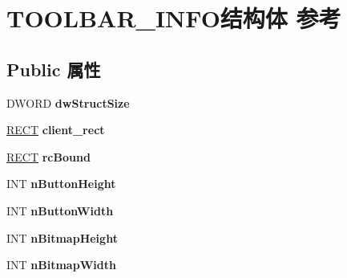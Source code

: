 \hypertarget{struct_t_o_o_l_b_a_r___i_n_f_o}{}\section{T\+O\+O\+L\+B\+A\+R\+\_\+\+I\+N\+F\+O结构体 参考}
\label{struct_t_o_o_l_b_a_r___i_n_f_o}
\subsection*{Public 属性}
\begin{DoxyCompactItemize}
\item 
\mbox{\label{struct_t_o_o_l_b_a_r___i_n_f_o_a9534167bdc4347206c2d0cf99f0d5d85}} 
D\+W\+O\+RD {\bfseries dw\+Struct\+Size}
\item 
\mbox{\label{struct_t_o_o_l_b_a_r___i_n_f_o_a04d05fea67ac153311fb3f33cab8c250}} 
\hyperlink{structtag_r_e_c_t}{R\+E\+CT} {\bfseries client\+\_\+rect}
\item 
\mbox{\label{struct_t_o_o_l_b_a_r___i_n_f_o_a894a31368d7639209eb26addf3ed2211}} 
\hyperlink{structtag_r_e_c_t}{R\+E\+CT} {\bfseries rc\+Bound}
\item 
\mbox{\label{struct_t_o_o_l_b_a_r___i_n_f_o_a806b3ef26a32764e5790c7f5c067f762}} 
I\+NT {\bfseries n\+Button\+Height}
\item 
\mbox{\label{struct_t_o_o_l_b_a_r___i_n_f_o_a463a0ef11636e469240aa1ded40bf2db}} 
I\+NT {\bfseries n\+Button\+Width}
\item 
\mbox{\label{struct_t_o_o_l_b_a_r___i_n_f_o_a4e843a26a5934925a479d827c3b8424a}} 
I\+NT {\bfseries n\+Bitmap\+Height}
\item 
\mbox{\label{struct_t_o_o_l_b_a_r___i_n_f_o_afea71b31c6b0cb5f814b695279a86fb6}} 
I\+NT {\bfseries n\+Bitmap\+Width}
\item 
\mbox{\label{struct_t_o_o_l_b_a_r___i_n_f_o_aa0e43356363ad98566717d505829dd73}} 

\end{DoxyCompactItemize}
